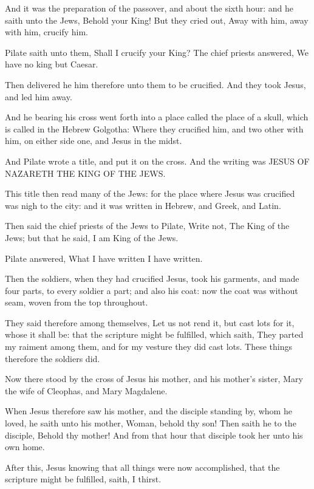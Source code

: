 \verse And it was the preparation of the passover, and about the sixth hour: and he saith unto the Jews, Behold your King!  \verse But they cried out, Away with him, away with him, crucify him.

Pilate saith unto them, Shall I crucify your King? The chief priests answered, We have no king but Caesar.

\verse Then delivered he him therefore unto them to be crucified. And they took Jesus, and led him away.

\verse And he bearing his cross went forth into a place called the place of a skull, which is called in the Hebrew Golgotha: \verse Where they crucified him, and two other with him, on either side one, and Jesus in the midst.

\verse And Pilate wrote a title, and put it on the cross. And the writing was JESUS OF NAZARETH THE KING OF THE JEWS.

\verse This title then read many of the Jews: for the place where Jesus was crucified was nigh to the city: and it was written in Hebrew, and Greek, and Latin.

\verse Then said the chief priests of the Jews to Pilate, Write not, The King of the Jews; but that he said, I am King of the Jews.

\verse Pilate answered, What I have written I have written.

\verse Then the soldiers, when they had crucified Jesus, took his garments, and made four parts, to every soldier a part; and also his coat: now the coat was without seam, woven from the top throughout.

\verse They said therefore among themselves, Let us not rend it, but cast lots for it, whose it shall be: that the scripture might be fulfilled, which saith, They parted my raiment among them, and for my vesture they did cast lots. These things therefore the soldiers did.

\verse Now there stood by the cross of Jesus his mother, and his mother's sister, Mary the wife of Cleophas, and Mary Magdalene.

\verse When Jesus therefore saw his mother, and the disciple standing by, whom he loved, he saith unto his mother, Woman, behold thy son!  \verse Then saith he to the disciple, Behold thy mother! And from that hour that disciple took her unto his own home.

\verse After this, Jesus knowing that all things were now accomplished, that the scripture might be fulfilled, saith, I thirst.

